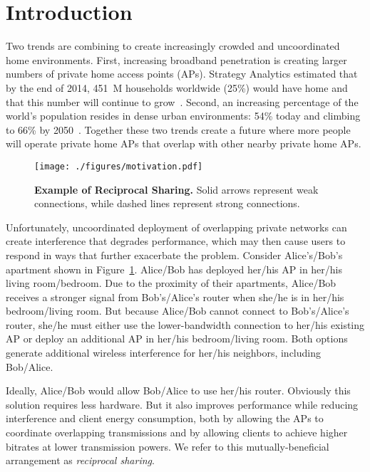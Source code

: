 \section{Introduction}
\label{sec-introduction}

Two trends are combining to create increasingly crowded and uncoordinated
home \wifi{} environments. First, increasing broadband penetration is
creating larger numbers of private home access points (APs). Strategy
Analytics estimated that by the end of 2014, 451~M households worldwide
(25\%) would have home \wifi{} and that this number will continue to
grow~\cite{wifi-survey}. Second, an increasing percentage of the world's
population resides in dense urban environments: 54\% today and climbing to
66\% by 2050~\cite{urbanization-survey}. Together these two trends create a
future where more people will operate private home APs that overlap with
other nearby private home APs.

\begin{figure}[t]
  \centering
  \texttt{[image: ./figures/motivation.pdf]}
  \caption{\textbf{Example of Reciprocal \wifi{} Sharing.} Solid arrows
  represent weak connections, while dashed lines represent strong
  connections.}
  \label{fig:motivation}
  \vspace*{-0.1in}
\end{figure}

Unfortunately, uncoordinated deployment of overlapping private networks can
create interference that degrades performance, which may then cause users to
respond in ways that further exacerbate the problem. Consider Alice's/Bob's
apartment shown in Figure~\ref{fig:motivation}. Alice/Bob has deployed
her/his AP in her/his living room/bedroom. Due to the proximity of their
apartments, Alice/Bob receives a stronger signal from Bob's/Alice's router
when she/he is in her/his bedroom/living room. But because Alice/Bob cannot
connect to Bob's/Alice's router, she/he must either use the lower-bandwidth
connection to her/his existing AP or deploy an additional AP in her/his
bedroom/living room. Both options generate additional wireless interference
for her/his neighbors, including Bob/Alice.

Ideally, Alice/Bob would allow Bob/Alice to use her/his router. Obviously
this solution requires less hardware. But it also improves performance while
reducing interference and client energy consumption, both by allowing the APs
to coordinate overlapping transmissions and by allowing clients to achieve
higher bitrates at lower transmission powers. We refer to this
mutually-beneficial arrangement as \textit{reciprocal \wifi{} sharing}.

